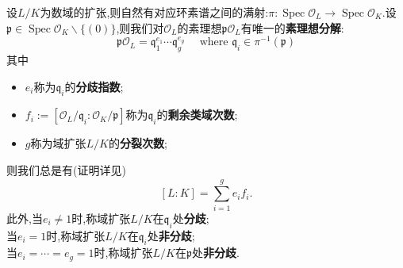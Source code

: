 \documentclass[12pt,A4paper,oneside,reqno]{amsart}
\numberwithin{equation}{section}
\theoremstyle{definition}
\theoremstyle{plain}
\theoremstyle{plain}
\numberwithin{equation}{section}
\theoremstyle{remark}
\newcommand{\Spec}{\operatorname{Spec}}
\begin{document}
设$L/K$为数域的扩张,则自然有对应环素谱之间的满射:$\pi:\Spec \mathcal{O}_L \longrightarrow \Spec \mathcal{O}_K$.设$\mathfrak{p} \in \Spec \mathcal{O}_K\smallsetminus \{(0)\}$,则我们对$\mathcal{O}_L$的素理想$\mathfrak{p}\mathcal{O}_L$有唯一的\textbf{素理想分解}:
$$\mathfrak{p}\mathcal{O}_L = \mathfrak{q}_1^{e_1}\cdots\mathfrak{q}_g^{e_g} \quad\text{ where } \mathfrak{q}_i \in \pi^{-1}(\mathfrak{p})$$
其中
\begin{itemize}
	\item $e_i$称为$\mathfrak{q}_i$的\textbf{分歧指数};
	\item $f_i:=[\mathcal{O}_L/\mathfrak{q}_i:\mathcal{O}_K/\mathfrak{p}]$称为$\mathfrak{q}_i$的\textbf{剩余类域次数};
	\item $g$称为域扩张$L/K$的\textbf{分裂次数};
\end{itemize}
则我们总是有(证明详见\cite[p46,定理2.5]{冯克勤2000代数数论})
\begin{equation}\label{eq:basicformulainan}
[L:K]=\sum_{i=1}^{g}e_if_i.
\end{equation}
此外,当$e_i\neq 1$时,称域扩张$L/K$在$\mathfrak{q}_i$处\textbf{分歧};\\
\phantom{此外,}当$e_i= 1$时,称域扩张$L/K$在$\mathfrak{q}_i$处\textbf{非分歧};\\
\phantom{此外,}当$e_i=\cdots =e_g= 1$时,称域扩张$L/K$在$\mathfrak{p}$处\textbf{非分歧}.
\end{document}
